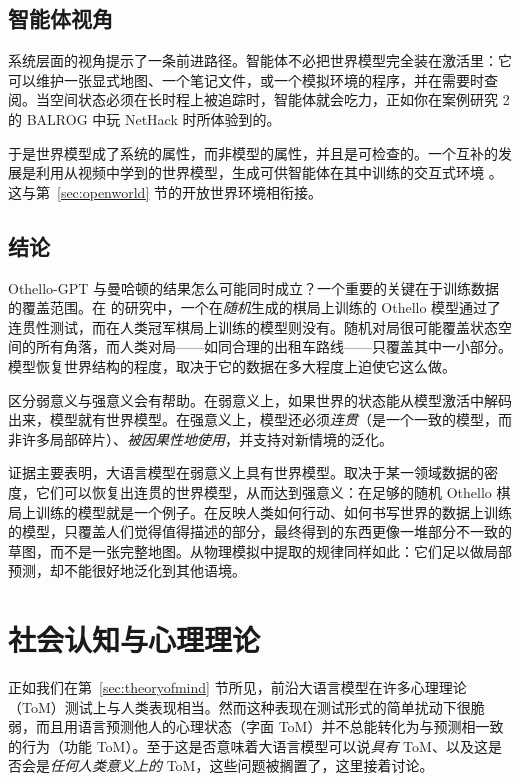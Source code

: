 \subsection{智能体视角}
系统层面的视角提示了一条前进路径。智能体不必把世界模型完全装在激活里：它可以维护一张显式地图、一个笔记文件，或一个模拟环境的程序，并在需要时查阅。当空间状态必须在长时程上被追踪时，智能体就会吃力，正如你在案例研究 2 的 BALROG 中玩 NetHack 时所体验到的。

于是世界模型成了系统的属性，而非模型的属性，并且是可检查的。一个互补的发展是利用从视频中学到的世界模型，生成可供智能体在其中训练的交互式环境 \citep{bruce2024genie}。这与第~\ref{sec:openworld} 节的开放世界环境相衔接。

\subsection{结论}
Othello-GPT 与曼哈顿的结果怎么可能同时成立？一个重要的关键在于训练数据的覆盖范围。在 \citet{vafa2024eval} 的研究中，一个在\emph{随机}生成的棋局上训练的 Othello 模型通过了连贯性测试，而在人类冠军棋局上训练的模型则没有。随机对局很可能覆盖状态空间的所有角落，而人类对局——如同合理的出租车路线——只覆盖其中一小部分。模型恢复世界结构的程度，取决于它的数据在多大程度上迫使它这么做。

区分弱意义与强意义会有帮助。在弱意义上，如果世界的状态能从模型激活中解码出来，模型就有世界模型。在强意义上，模型还必须\emph{连贯}（是一个一致的模型，而非许多局部碎片）、\emph{被因果性地使用}，并支持对新情境的泛化。

证据主要表明，大语言模型在弱意义上具有世界模型。取决于某一领域数据的密度，它们可以恢复出连贯的世界模型，从而达到强意义：在足够的随机 Othello 棋局上训练的模型就是一个例子。在反映人类如何行动、如何书写世界的数据上训练的模型，只覆盖人们觉得值得描述的部分，最终得到的东西更像一堆部分不一致的草图，而不是一张完整地图。从物理模拟中提取的规律同样如此：它们足以做局部预测，却不能很好地泛化到其他语境。
\section{社会认知与心理理论}\label{sec:tomcognition}\label{sec:tomcog}
正如我们在第~\ref{sec:theoryofmind} 节所见，前沿大语言模型在许多心理理论（ToM）测试上与人类表现相当。然而这种表现在测试形式的简单扰动下很脆弱，而且用语言预测他人的心理状态（字面 ToM）并不总能转化为与预测相一致的行为（功能 ToM）。至于这是否意味着大语言模型可以说\emph{具有} ToM、以及这是否会是\emph{任何人类意义上的} ToM，这些问题被搁置了，这里接着讨论。

